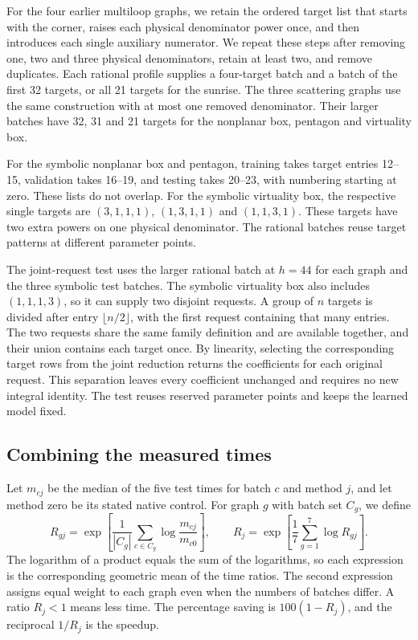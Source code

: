 For the four earlier multiloop graphs, we retain the ordered target list
that starts with the corner, raises each physical denominator power once,
and then introduces each single auxiliary numerator. We repeat these
steps after removing one, two and three physical denominators, retain at
least two, and remove duplicates. Each rational profile supplies a
four-target batch and a batch of the first 32 targets, or all 21 targets
for the sunrise. The three scattering graphs use the same construction
with at most one removed denominator. Their larger batches have 32, 31
and 21 targets for the nonplanar box, pentagon and virtuality box.

For the symbolic nonplanar box and pentagon, training takes target entries
12--15, validation takes 16--19, and testing takes 20--23, with numbering
starting at zero. These lists do not overlap. For the symbolic virtuality
box, the respective single targets are $(3,1,1,1)$, $(1,3,1,1)$ and
$(1,1,3,1)$. These targets have two extra powers on one physical denominator.
The rational batches reuse target patterns at different parameter points.

The joint-request test uses the larger rational batch at $h=44$ for each
graph and the three symbolic test batches. The symbolic virtuality box
also includes $(1,1,1,3)$, so it can supply two disjoint requests. A group
of $n$ targets is divided after entry $\lfloor n/2\rfloor$, with the first
request containing that many entries. The two requests share the same family definition and are available together, and their union contains each target once. By linearity, selecting the corresponding target rows from the joint reduction returns the coefficients for each original request. This separation leaves every coefficient unchanged and requires no new integral identity. The test reuses reserved parameter points and keeps the learned
model fixed.

\subsection{Combining the measured times}
Let $m_{cj}$ be the median of the five test times for batch $c$ and
method $j$, and let method zero be its stated native control.
For graph $g$ with batch set $C_g$, we define
\begin{equation}
 R_{gj}=\exp\!\left[\frac{1}{|C_g|}
       \sum_{c\in C_g}\log\frac{m_{cj}}{m_{c0}}\right],
 \qquad
 R_j=\exp\!\left[\frac{1}{7}\sum_{g=1}^{7}\log R_{gj}\right].
\end{equation}
The logarithm of a product equals the sum of the logarithms, so each
expression is the corresponding geometric mean of the time ratios.
The second expression assigns equal weight to each graph even when the
numbers of batches differ. A ratio $R_j<1$ means less time. The percentage
saving is $100(1-R_j)$, and the reciprocal $1/R_j$ is the speedup.

